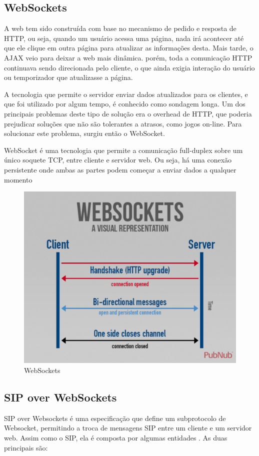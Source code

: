 \documentclass[ruledheader]{abnt} %
\begin{document}
\subsection{WebSockets}
\label{ss_webSockets}
A web tem sido construída com base no mecanismo de pedido e resposta de HTTP, ou seja, quando um usuário acessa uma página, nada irá acontecer até que ele clique em outra página para atualizar as informações desta. Mais tarde, o AJAX veio para deixar a web mais dinâmica. porém, toda a comunicação HTTP continuava sendo direcionada pelo cliente, o que ainda exigia interação do usuário ou  temporizador que atualizasse a página. 

A tecnologia que permite o servidor enviar dados atualizados para os clientes, e que foi utilizado por algum tempo, é conhecido como sondagem longa. Um dos principais problemas deste tipo de solução era o overhead de HTTP, que poderia prejudicar soluções que não são tolerantes a atrasos, como jogos on-line. Para solucionar este problema, surgiu então o WebSocket.

WebSocket é uma tecnologia que permite a comunicação full-duplex sobre um único soquete TCP, entre cliente e servidor web. Ou seja, há uma conexão persistente onde ambas as partes podem começar a enviar dados a qualquer momento

\begin{figure}[!htdb]
 \centering
  \includegraphics[width = 0.8\linewidth]{images/websocket}
  \caption{WebSockets} %
  \label{f_mediaStream}
\end{figure}

\subsection{SIP over WebSockets}
\label{ss_sipWebsockets}
SIP over Websockets é uma especificação que define um subprotocolo de Websocket, permitindo a troca de mensagens SIP entre um cliente e um servidor web. Assim como o SIP, ela é composta por algumas entidades \cite{Amaral:2013}. As duas principais são:
\end{document}
